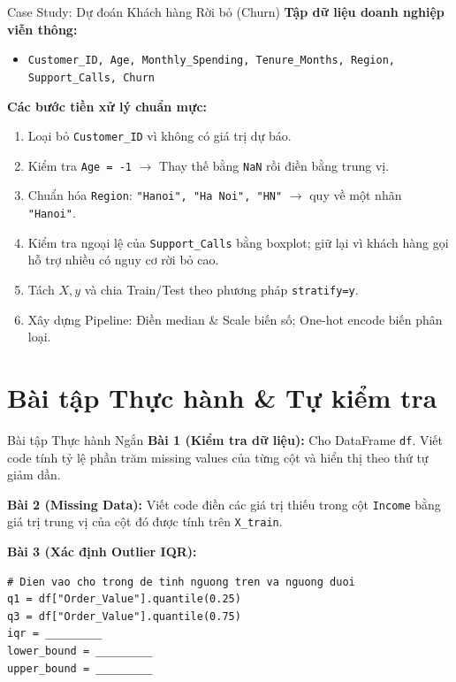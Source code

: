 \documentclass[aspectratio=169,11pt]{beamer}
\newcommand{\code}[1]{\texttt{#1}}
\newcommand{\smallgap}{\vspace{0.35em}}
\begin{document}
\begin{frame}{Case Study: Dự đoán Khách hàng Rời bỏ (Churn)}
\textbf{Tập dữ liệu doanh nghiệp viễn thông:}
\begin{itemize}
  \item \code{Customer\_ID, Age, Monthly\_Spending, Tenure\_Months, Region, Support\_Calls, Churn}
\end{itemize}

\textbf{Các bước tiền xử lý chuẩn mực:}
\begin{enumerate}
  \item Loại bỏ \code{Customer\_ID} vì không có giá trị dự báo.
  \item Kiểm tra \code{Age = -1} $\rightarrow$ Thay thế bằng \code{NaN} rồi điền bằng trung vị.
  \item Chuẩn hóa \code{Region}: \code{"Hanoi", "Ha Noi", "HN"} $\rightarrow$ quy về một nhãn \code{"Hanoi"}.
  \item Kiểm tra ngoại lệ của \code{Support\_Calls} bằng boxplot; giữ lại vì khách hàng gọi hỗ trợ nhiều có nguy cơ rời bỏ cao.
  \item Tách $X, y$ và chia Train/Test theo phương pháp \code{stratify=y}.
  \item Xây dựng Pipeline: Điền median \& Scale biến số; One-hot encode biến phân loại.
\end{enumerate}
\end{frame}

\section{Bài tập Thực hành \& Tự kiểm tra}

\begin{frame}[fragile]{Bài tập Thực hành Ngắn}
\textbf{Bài 1 (Kiểm tra dữ liệu):} Cho DataFrame \code{df}. Viết code tính tỷ lệ phần trăm missing values của từng cột và hiển thị theo thứ tự giảm dần.

\smallgap
\textbf{Bài 2 (Missing Data):} Viết code điền các giá trị thiếu trong cột \code{Income} bằng giá trị trung vị của cột đó được tính trên \code{X\_train}.

\smallgap
\textbf{Bài 3 (Xác định Outlier IQR):}
\begin{lstlisting}[style=pythonstyle]
# Dien vao cho trong de tinh nguong tren va nguong duoi
q1 = df["Order_Value"].quantile(0.25)
q3 = df["Order_Value"].quantile(0.75)
iqr = _________
lower_bound = _________
upper_bound = _________
\end{lstlisting}
\end{frame}
\end{document}
